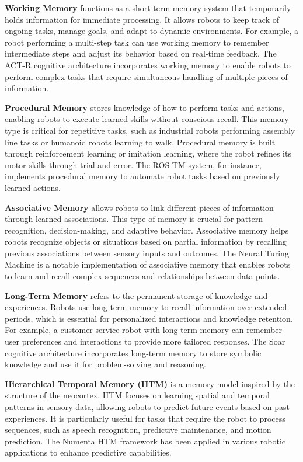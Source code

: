     \textbf{Working Memory} functions as a short-term memory system that temporarily holds information for immediate processing. It allows robots to keep track of ongoing tasks, manage goals, and adapt to dynamic environments. For example, a robot performing a multi-step task can use working memory to remember intermediate steps and adjust its behavior based on real-time feedback. The ACT-R cognitive architecture incorporates working memory to enable robots to perform complex tasks that require simultaneous handling of multiple pieces of information. 

    \textbf{Procedural Memory} stores knowledge of how to perform tasks and actions, enabling robots to execute learned skills without conscious recall. This memory type is critical for repetitive tasks, such as industrial robots performing assembly line tasks or humanoid robots learning to walk. Procedural memory is built through reinforcement learning or imitation learning, where the robot refines its motor skills through trial and error. The ROS-TM system, for instance, implements procedural memory to automate robot tasks based on previously learned actions. 

    \textbf{Associative Memory} allows robots to link different pieces of information through learned associations. This type of memory is crucial for pattern recognition, decision-making, and adaptive behavior. Associative memory helps robots recognize objects or situations based on partial information by recalling previous associations between sensory inputs and outcomes. The Neural Turing Machine is a notable implementation of associative memory that enables robots to learn and recall complex sequences and relationships between data points. 

    \textbf{Long-Term Memory} refers to the permanent storage of knowledge and experiences. Robots use long-term memory to recall information over extended periods, which is essential for personalized interactions and knowledge retention. For example, a customer service robot with long-term memory can remember user preferences and interactions to provide more tailored responses. The Soar cognitive architecture incorporates long-term memory to store symbolic knowledge and use it for problem-solving and reasoning. 

    \textbf{Hierarchical Temporal Memory (HTM)} is a memory model inspired by the structure of the neocortex. HTM focuses on learning spatial and temporal patterns in sensory data, allowing robots to predict future events based on past experiences. It is particularly useful for tasks that require the robot to process sequences, such as speech recognition, predictive maintenance, and motion prediction. The Numenta HTM framework has been applied in various robotic applications to enhance predictive capabilities. 



